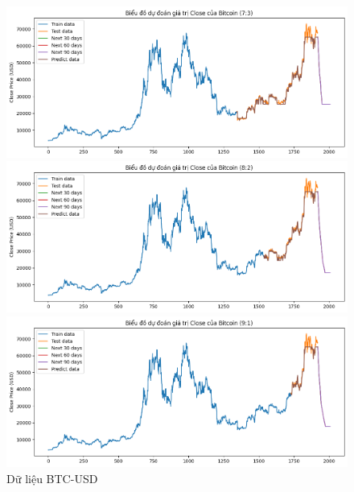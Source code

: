 \documentclass[conference]{IEEEtran}
\begin{document}
	\begin{figure}[H]
		\centering
		\begin{minipage}{0.15\textwidth}
			\centering
			\includegraphics[width=1\textwidth]{Figure/XGB_BTC_73.png}
		\end{minipage}
		\hfill
		\begin{minipage}{0.15\textwidth}
			\centering
			\includegraphics[width=1\textwidth]{Figure/XGB_BTC_82.png}
		\end{minipage}
		\hfill
		\begin{minipage}{0.15\textwidth}
			\centering
			\includegraphics[width=1\textwidth]{Figure/XGB_BTC_91.png}
		\end{minipage}
		\caption{Dữ liệu BTC-USD}
		\label{fig:1}
	\end{figure}
	
\end{document}
